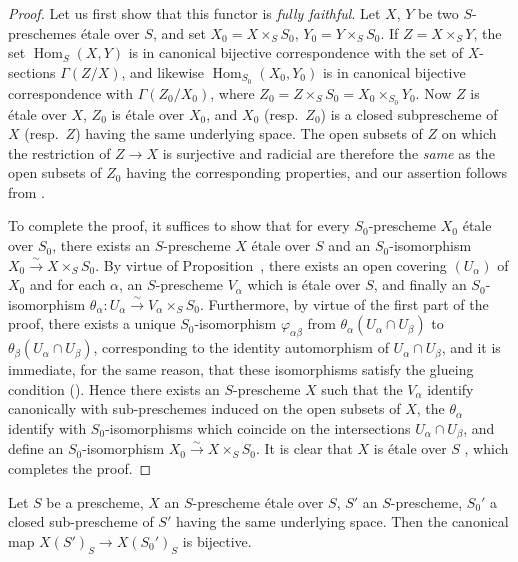 \begin{proof}
Let us first show that this functor is \emph{fully faithful}.
Let $X$, $Y$ be two $S$-preschemes \'etale over $S$, and set $X_0=X\times_S S_0$, $Y_0=Y\times_S S_0$.
If $Z=X\times_S Y$, the set $\operatorname{Hom}_S(X,Y)$ is in canonical bijective correspondence with the set of $X$-sections $\Gamma(Z/X)$, and likewise $\operatorname{Hom}_{S_0}(X_0,Y_0)$ is in canonical bijective correspondence with $\Gamma(Z_0/X_0)$, where $Z_0=Z\times_S S_0=X_0\times_{S_0}Y_0$.
Now $Z$ is \'etale over $X$, $Z_0$ is \'etale over $X_0$, and $X_0$ (resp.\ $Z_0$) is a closed subprescheme of $X$ (resp.\ $Z$) having the same underlying space.  The open subsets of $Z$ on which the restriction of $Z\to X$ is surjective and radicial are therefore the \emph{same} as the open subsets of $Z_0$ having the corresponding properties, and our assertion follows from .

To complete the proof, it suffices to show that for every $S_0$-prescheme $X_0$ \'etale over $S_0$, there exists an $S$-prescheme $X$ \'etale over $S$ and an $S_0$-isomorphism $X_0\xrightarrow{\sim}X\times_S S_0$.
By virtue of Proposition~, there exists an open covering $(U_\alpha)$ of $X_0$ and for each $\alpha$, an $S$-prescheme $V_\alpha$ which is \'etale over $S$, and finally an $S_0$-isomorphism $\theta_\alpha:U_\alpha\xrightarrow{\sim}V_\alpha\times_S S_0$.
Furthermore, by virtue of the first part of the proof, there exists a unique $S_0$-isomorphism $\varphi_{\alpha\beta}$ from $\theta_\alpha(U_\alpha\cap U_\beta)$ to $\theta_\beta(U_\alpha\cap U_\beta)$, corresponding to the identity automorphism of $U_\alpha\cap U_\beta$, and it is immediate, for the same reason, that these isomorphisms satisfy the glueing condition ().
Hence there exists an $S$-prescheme $X$ such that the $V_\alpha$ identify canonically with sub-preschemes induced on the open subsets of $X$, the $\theta_\alpha$ identify with $S_0$-isomorphisms which coincide on the intersections $U_\alpha\cap U_\beta$, and define an $S_0$-isomorphism $X_0\xrightarrow{\sim}X\times_S S_0$.
It is clear that $X$ is \'etale over $S$ , which completes the proof.
\end{proof}

\begin{corollary}[18.1.3]
\label{IV.18.1.3}
Let $S$ be a prescheme, $X$ an $S$-prescheme \'etale over $S$, $S'$ an $S$-prescheme, $S_0'$ a closed sub-prescheme of $S'$ having the same underlying space.
Then the canonical map $X(S')_S\to X(S_0')_S$  is bijective.
\end{corollary}

